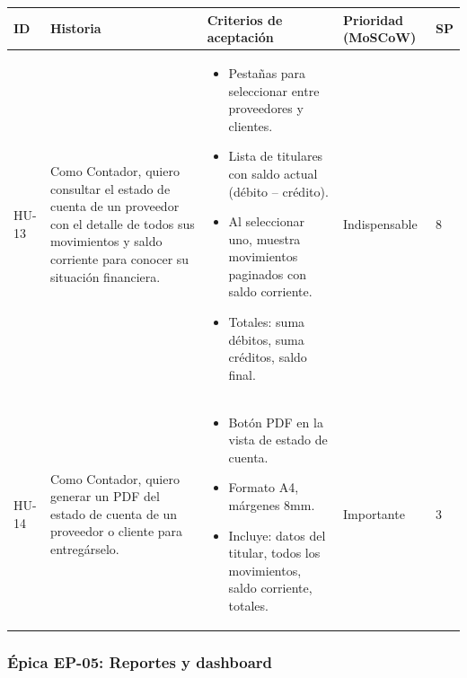 \documentclass[stu]{apa7}
\begin{document}
\begin{longtable}{|L{0.8cm}|L{4.5cm}|L{3.5cm}|L{2cm}|L{1.5cm}|}
\hline
{}
\textbf{ID} & \textbf{Historia} & \textbf{Criterios de aceptación} & \textbf{Prioridad (MoSCoW)} & \textbf{SP} \\
\hline
\endhead
HU-13 & Como Contador, quiero consultar el estado de cuenta de un proveedor con el detalle de todos sus movimientos y saldo corriente para conocer su situación financiera. & 
\begin{itemize}[nosep]
    \item Pestañas para seleccionar entre proveedores y clientes.
    \item Lista de titulares con saldo actual (débito -- crédito).
    \item Al seleccionar uno, muestra movimientos paginados con saldo corriente.
    \item Totales: suma débitos, suma créditos, saldo final.
\end{itemize} & Indispensable & 8 \\
\hline
HU-14 & Como Contador, quiero generar un PDF del estado de cuenta de un proveedor o cliente para entregárselo. & 
\begin{itemize}[nosep]
    \item Botón PDF en la vista de estado de cuenta.
    \item Formato A4, márgenes 8mm.
    \item Incluye: datos del titular, todos los movimientos, saldo corriente, totales.
\end{itemize} & Importante & 3 \\
\hline
\end{longtable}

\subsubsection{Épica EP-05: Reportes y dashboard}
\end{document}
